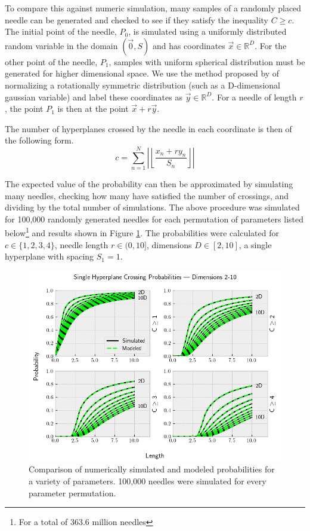 \documentclass{article}
\begin{document}
To compare this against numeric simulation, many samples of a randomly placed needle can be generated and checked to
see if they satisfy the inequality $C\ge c$.
The initial point of the needle, $P_0$, is simulated using a uniformly distributed random variable in 
the domain $(\vec 0, S)$ and has coordinates $\vec x \in \mathbb{R}^D$. For the other point of the needle, $P_1$, samples 
with uniform spherical distribution must be generated for higher dimensional space. We use the method
proposed by \citet{marsaglia72} of normalizing a rotationally symmetric distribution 
(such as a D-dimensional gaussian variable) and label these coordinates as $\vec y \in \mathbb{R}^D$. For a needle of
length $r$, the point $P_1$ is then at the point $\vec x + r \vec y$.

The number of hyperplanes crossed by the needle in each coordinate is then of the following form.
\begin{equation}
	c = \sum_{n=1}^{N} \left|\left\lfloor \frac{x_n+r y_n}{S_n} \right\rfloor\right|
\end{equation}

The expected value of the probability can then be approximated by simulating many needles, checking
how many have satisfied the number of crossings, and dividing by the total number of simulations.
The above procedure was simulated for 100,000 randomly generated needles for each permutation of parameters
listed below\footnote{For a total of 363.6 million needles} and results shown in Figure \ref{fig:numeric sim N1}. The probabilities were calculated for
$c\in\{1,2,3,4\}$, needle length $r\in(0, 10]$, dimensions $D\in[2, 10]$, a single hyperplane with
spacing $S_1=1$.

\begin{figure}
	\centerline{\includegraphics[width=5in]{numeric_sim_N1.png}}
	\caption{Comparison of numerically simulated and modeled probabilities for a variety of parameters.
	100,000 needles were simulated for every parameter permutation.}
	\label{fig:numeric sim N1}
\end{figure}
\end{document}
